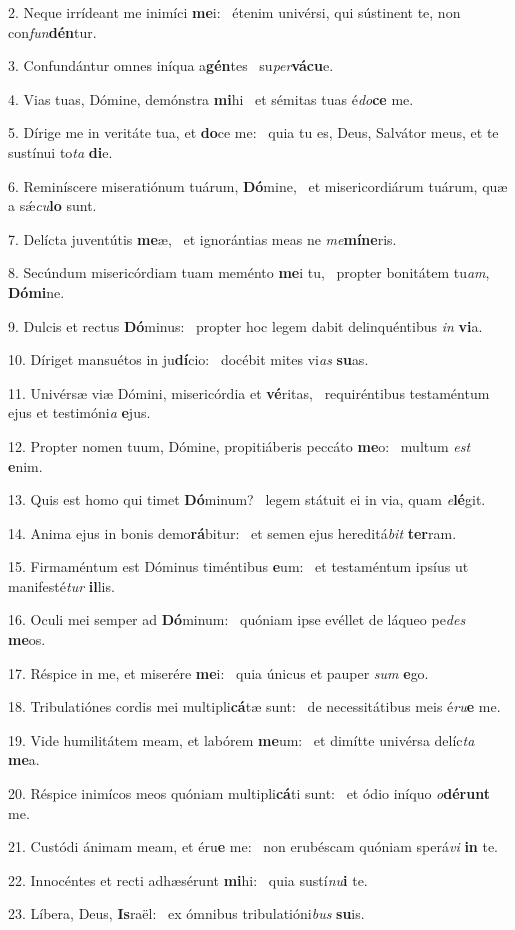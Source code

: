 2. Neque irrídeant me inimíci \textbf{me}i: \ast\  étenim univérsi, qui sústinent te, non con\textit{fun}\textbf{dén}tur.\

3. Confundántur omnes iníqua a\textbf{gén}tes \ast\  su\textit{per}\textbf{vá}\textbf{cu}e.\

4. Vias tuas, Dómine, demónstra \textbf{mi}hi \ast\  et sémitas tuas é\textit{do}\textbf{ce} me.\

5. Dírige me in veritáte tua, et \textbf{do}ce me: \ast\  quia tu es, Deus, Salvátor meus, et te sustínui to\textit{ta} \textbf{di}e.\

6. Reminíscere miseratiónum tuárum, \textbf{Dó}mine, \ast\  et misericordiárum tuárum, quæ a sǽ\textit{cu}\textbf{lo} sunt.\

7. Delícta juventútis \textbf{me}æ, \ast\  et ignorántias meas ne \textit{me}\textbf{mí}\textbf{ne}ris.\

8. Secúndum misericórdiam tuam meménto \textbf{me}i tu, \ast\  propter bonitátem tu\textit{am}, \textbf{Dó}\textbf{mi}ne.\

9. Dulcis et rectus \textbf{Dó}minus: \ast\  propter hoc legem dabit delinquéntibus \textit{in} \textbf{vi}a.\

10. Díriget mansuétos in ju\textbf{dí}cio: \ast\  docébit mites vi\textit{as} \textbf{su}as.\

11. Univérsæ viæ Dómini, misericórdia et \textbf{vé}ritas, \ast\  requiréntibus testaméntum ejus et testimóni\textit{a} \textbf{e}jus.\

12. Propter nomen tuum, Dómine, propitiáberis peccáto \textbf{me}o: \ast\  multum \textit{est} \textbf{e}nim.\

13. Quis est homo qui timet \textbf{Dó}minum? \ast\  legem státuit ei in via, quam \textit{e}\textbf{lé}git.\

14. Anima ejus in bonis demo\textbf{rá}bitur: \ast\  et semen ejus hereditá\textit{bit} \textbf{ter}ram.\

15. Firmaméntum est Dóminus timéntibus \textbf{e}um: \ast\  et testaméntum ipsíus ut manifesté\textit{tur} \textbf{il}lis.\

16. Oculi mei semper ad \textbf{Dó}minum: \ast\  quóniam ipse evéllet de láqueo pe\textit{des} \textbf{me}os.\

17. Réspice in me, et miserére \textbf{me}i: \ast\  quia únicus et pauper \textit{sum} \textbf{e}go.\

18. Tribulatiónes cordis mei multipli\textbf{cá}tæ sunt: \ast\  de necessitátibus meis é\textit{ru}\textbf{e} me.\

19. Vide humilitátem meam, et labórem \textbf{me}um: \ast\  et dimítte univérsa delíc\textit{ta} \textbf{me}a.\

20. Réspice inimícos meos quóniam multipli\textbf{cá}ti sunt: \ast\  et ódio iníquo \textit{o}\textbf{dé}\textbf{runt} me.\

21. Custódi ánimam meam, et éru\textbf{e} me: \ast\  non erubéscam quóniam sperá\textit{vi} \textbf{in} te.\

22. Innocéntes et recti adhæsérunt \textbf{mi}hi: \ast\  quia sustí\textit{nu}\textbf{i} te.\

23. Líbera, Deus, \textbf{Is}raël: \ast\  ex ómnibus tribulatióni\textit{bus} \textbf{su}is.\

